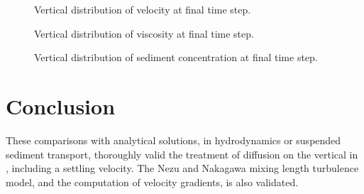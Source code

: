 \begin{figure}[H]
  \centering
  \caption{Vertical distribution of velocity at final time step.}
  \label{t3d:Rouse:Velotf}
\end{figure}

\begin{figure}[H]
  \centering
  \caption{Vertical distribution of viscosity at final time step.}
  \label{t3d:Rouse:Visctf}
\end{figure}

\begin{figure}[H]
  \centering
  \caption{Vertical distribution of sediment concentration at final time step.}
  \label{t3d:Rouse:Seditf}
\end{figure}

\section{Conclusion}

These comparisons with analytical solutions, in hydrodynamics or
suspended sediment transport, thoroughly valid the treatment of
diffusion on the vertical in , including a settling
 velocity.
The Nezu and Nakagawa mixing length turbulence model, and the
computation of velocity gradients, is also validated.
